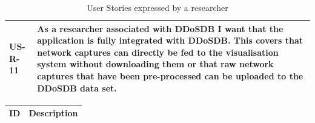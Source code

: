 \begin{table}[]
\begin{tabular}{|p{1.6cm}|p{12cm}|}
US-R-11     & As a researcher associated with DDoSDB I want that the application is fully integrated with DDoSDB. This covers that network captures can directly be fed to the visualisation system without downloading them or that raw network captures that have been pre-processed can be uploaded to the DDoSDB data set.\\ \hline
\end{tabular}
\caption{User Stories expressed by a researcher}
\label{table:us-researcher}
\end{table} 

\begin{table}[]
\centering
\begin{tabular}{|p{1.6cm}|p{12cm}|}
\hline
\textbf{ID} & \textbf{Description} \\ \hline


\end{tabular}
\end{table}

